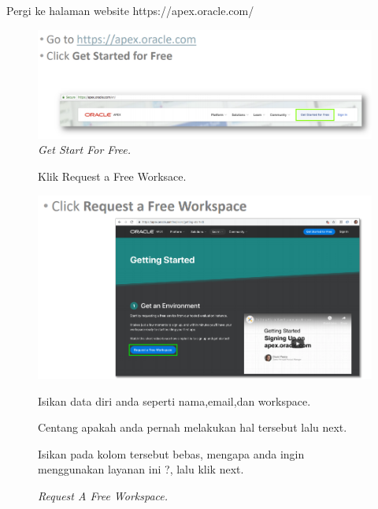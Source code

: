 \begin{enumerate}
\item[1] Pergi ke halaman website https://apex.oracle.com/

\begin{figure}[!htbp]
    \begin{center}
    \includegraphics[scale=0.5]{figures/1.PNG}
    \caption{\textit{Get Start For Free.}}
    \end{center}   
    \end{figure}
    
\begin{figure}[!htbp]
\item[2]Klik Request a Free Worksace.

    \begin{center}
    \includegraphics[scale=0.5]{figures/2.PNG}
    \caption{\textit{Request A Free Workspace.}}
    \end{center}

\item[3]Isikan data diri anda seperti nama,email,dan workspace.
        
\item[4]Centang apakah anda pernah melakukan hal tersebut lalu next. 

\item[5]Isikan pada kolom tersebut bebas, mengapa anda ingin menggunakan layanan ini ?, lalu klik next.


\end{figure}
\end{enumerate}
